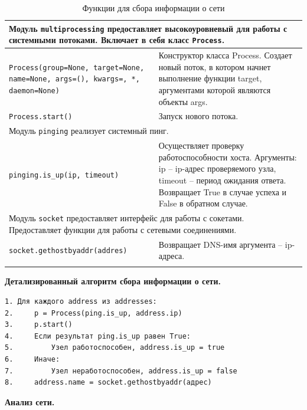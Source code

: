 \documentclass[a4paper]{article}
\begin{document}
			\begin{longtable}{|p{6cm}|p{10cm}|}
			\hline
				\multicolumn{2}{|p{15cm}|}{Модуль \texttt{multiprocessing} предоставляет высокоуровневый для работы с системными потоками. Включает в себя класс \texttt{Process}.}\\
			\hline
				\texttt{Process(group=None, target=None, name=None, args=(), kwargs={}, *, daemon=None)} & Конструктор класса Process. Создает новый поток, в котором начнет выполнение функции target, аргументами которой являются объекты args.\\
			\hline
				\texttt{Process.start()} & Запуск нового потока.\\
			\hline
				\multicolumn{2}{|p{15cm}|}{Модуль \texttt{pinging} реализует системный пинг.}\\
			\hline
				\texttt{pinging.is\_up(ip, timeout)} & Осуществляет проверку работоспособности хоста. Аргументы: ip -- ip-адрес проверяемого узла, timeout -- период ожидания ответа. Возвращает True в случае успеха и False в обратном случае.\\
			\hline
				\multicolumn{2}{|p{15cm}|}{Модуль \texttt{socket} предоставляет интерфейс для работы с сокетами. Предоставляет функции для работы с сетевыми соединениями.}\\
			\hline
				\texttt{socket.gethostbyaddr(addres)} & Возвращает DNS-имя аргумента -- ip-адреса.\\
			\hline
			\caption{Функции для сбора информации о сети}
		\end{longtable}
		
		\textbf{Детализированный алгоритм сбора информации о сети.}
	\begin{verbatim}
1. Для каждого address из addresses:
2.     p = Process(ping.is_up, address.ip)
3.     p.start()
4.     Если результат ping.is_up равен True:
5.         Узел работоспособен, address.is_up = true
6.     Иначе:
7.         Узел неработоспособен, address.is_up = false
8.     address.name = socket.gethostbyaddr(адрес)
\end{verbatim}

	\textbf{Анализ сети.}
\end{document}
